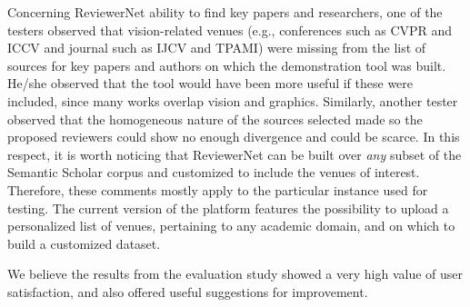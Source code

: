 Concerning ReviewerNet ability to find key papers and researchers, one of the testers observed that vision-related venues (e.g., conferences such as CVPR and ICCV and journal such as IJCV and TPAMI) were missing from the list of sources for key papers and authors on which the demonstration tool was built. He/she observed that the tool would have been more useful if these were included, since many works overlap vision and graphics. Similarly, another tester observed that the homogeneous nature of the sources selected made so the proposed reviewers could show no enough divergence and could be scarce. In this respect, it is worth noticing that ReviewerNet can be built over \emph{any} subset of the Semantic Scholar corpus and customized to include the venues of interest. Therefore, these comments mostly apply to the particular instance used for testing. The current version of the platform features the possibility to upload a personalized list of venues, pertaining to any academic domain, and on which to build a customized dataset. %


We believe the results from the evaluation study showed a very high value of user satisfaction, and also offered useful suggestions for improvement.




  




   

      